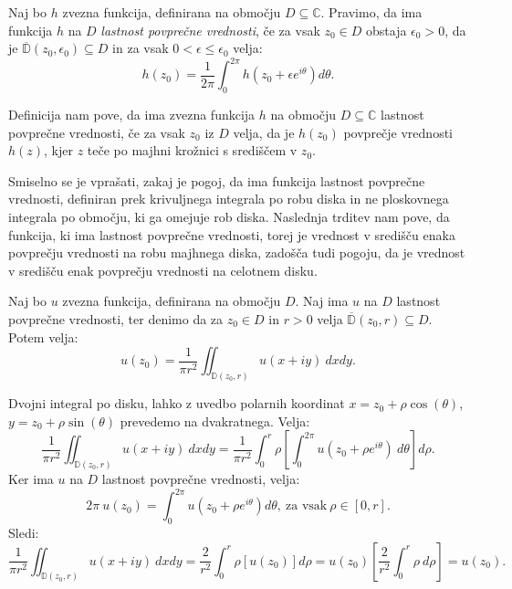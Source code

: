 \documentclass[mat1]{fmfdelo}
\newcommand{\C}{\mathbb C}
\begin{document}
    \begin{definicija}
        Naj bo $h$ zvezna funkcija, definirana na območju $D \subseteq \C$. Pravimo, da ima funkcija $h$ na $D$ \emph{lastnost povprečne vrednosti}, če za vsak $z_0 \in D$ obstaja $\epsilon_0 > 0$, da je $\overline{\mathbb{D}}(z_0, \epsilon_0) \subseteq D$ in za vsak $0 < \epsilon \leq \epsilon_0 $ velja:
        $$
            h(z_0) = \frac{1}{2 \pi} \int_{0}^{2 \pi}{h(z_0 + \epsilon e^{i \theta}) d\theta}.
        $$
    \end{definicija}
    \begin{opomba}
        Definicija nam pove, da ima zvezna funkcija $h$ na območju $D \subseteq \C$ lastnost povprečne vrednosti, če za vsak $z_0$ iz $D$ velja, 
        da je $h(z_0)$ povprečje vrednosti $h(z)$, kjer $z$ teče po majhni krožnici s središčem v $z_0$.
    \end{opomba}

    Smiselno se je vprašati, zakaj je pogoj, da ima funkcija lastnost povprečne vrednosti, definiran prek krivuljnega integrala po robu diska in ne ploskovnega integrala po območju, ki ga omejuje rob diska.
    Naslednja trditev nam pove, da funkcija, ki ima lastnost povprečne vrednosti, torej je vrednost v središču enaka povprečju vrednosti na robu majhnega diska, zadošča tudi pogoju, da je vrednost v središču enak povprečju vrednosti na celotnem disku.

    \begin{trditev}
        Naj bo $u$ zvezna funkcija, definirana na območju $D$. Naj ima $u$ na $D$ lastnost povprečne vrednosti, ter denimo da za $z_0 \in D$ in $r>0$ velja $\overline{\mathbb{D}}(z_0,r) \subseteq D$. Potem velja:
        $$
            u(z_0) = \frac{1}{\pi r^2} \iint_{\mathbb{D}(z_0,r)}{u(x + iy)~dxdy}.
        $$
    \end{trditev}
    \begin{dokaz}
        Dvojni integral po disku, lahko z uvedbo polarnih koordinat $x = z_0 + \rho \cos(\theta)$, $y = z_0 + \rho \sin(\theta)$ prevedemo na dvakratnega. Velja:
        $$
        \frac{1}{\pi r^2} \iint_{\mathbb{D}(z_0,r)}{u(x + iy)~dxdy} = \frac{1}{\pi r^2} \int_{0}^{r}{\rho \left[\int_{0}^{2 \pi} u(z_0 + \rho e^{i\theta})~d\theta \right]d\rho}. 
        $$
        Ker ima $u$ na $D$ lastnost povprečne vrednosti, velja:
        $$
            2 \pi~u(z_0) = \int_{0}^{2 \pi}{u(z_0 + \rho e^{i \theta}) d\theta},~\text{za vsak}~\rho \in [0, r].
        $$
        Sledi:
        $$
        \frac{1}{\pi r^2} \iint_{\mathbb{D}(z_0,r)}{u(x + iy)~dxdy} = \frac{2}{r^2} \int_{0}^{r}{\rho \left[u(z_0)\right]d\rho} = u(z_0) \left[\frac{2}{r^2} \int_{0}^{r}{\rho~d\rho}\right] = u(z_0).
        $$
    \end{dokaz}
\end{document}
